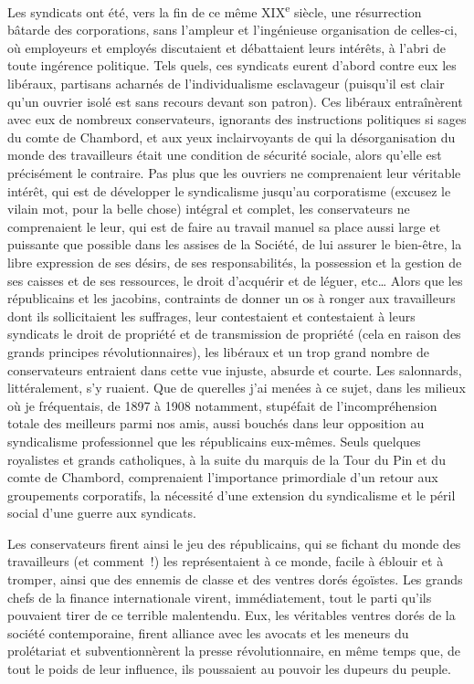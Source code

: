 \documentclass[french,twoside]{book} %
\begin{document}
Les syndicats ont été, vers la fin de ce même XIX\textsuperscript{e} siècle, une résurrection bâtarde des corporations, sans l’ampleur et l’ingénieuse organisation de celles-ci, où employeurs et employés discutaient et débattaient leurs intérêts, à l’abri de toute ingérence politique. Tels quels, ces syndicats eurent d’abord contre eux les libéraux, partisans acharnés de l’individualisme esclavageur (puisqu’il est clair qu’un ouvrier isolé est sans recours devant son patron). Ces libéraux entraînèrent avec eux de nombreux conservateurs, ignorants des instructions politiques si sages du comte de Chambord, et aux yeux inclairvoyants de qui la désorganisation du monde des travailleurs était une condition de sécurité sociale, alors qu’elle est précisément le contraire. Pas plus que les ouvriers ne comprenaient leur véritable intérêt, qui est de développer le syndicalisme jusqu’au corporatisme (excusez le vilain mot, pour la belle chose) intégral et complet, les conservateurs ne comprenaient le leur, qui est de faire au travail manuel sa place aussi large et puissante que possible dans les assises de la Société, de lui assurer le bien-être, la libre expression de ses désirs, de ses responsabilités, la possession et la gestion de ses caisses et de ses ressources, le droit d’acquérir et de léguer, etc… Alors que les républicains et les jacobins, contraints de donner un os à ronger aux travailleurs dont ils sollicitaient les suffrages, leur contestaient et contestaient à leurs syndicats le droit de propriété et de transmission de propriété (cela en raison des grands principes révolutionnaires), les libéraux et un trop grand nombre de conservateurs entraient dans cette vue injuste, absurde et courte. Les salonnards, littéralement, s’y ruaient. Que de querelles j’ai menées à ce sujet, dans les milieux où je fréquentais, de 1897 à 1908 notamment, stupéfait de l’incompréhension totale des meilleurs parmi nos amis, aussi bouchés dans leur opposition au syndicalisme professionnel que les républicains eux-mêmes. Seuls quelques royalistes et grands catholiques, à la suite du marquis de la Tour du Pin et du comte de Chambord, comprenaient l’importance primordiale d’un retour aux groupements corporatifs, la nécessité d’une extension du syndicalisme et le péril social d’une guerre aux syndicats.\par
Les conservateurs firent ainsi le jeu des républicains, qui se fichant du monde des travailleurs (et comment !) les représentaient à ce monde, facile à éblouir et à tromper, ainsi que des ennemis de classe et des ventres dorés égoïstes. Les grands chefs de la finance internationale virent, immédiatement, tout le parti qu’ils pouvaient tirer de ce terrible malentendu. Eux, les véritables ventres dorés de la société contemporaine, firent alliance avec les avocats et les meneurs du prolétariat et subventionnèrent la presse révolutionnaire, en même temps que, de tout le poids de leur influence, ils poussaient au pouvoir les dupeurs du peuple.\par
\end{document}
